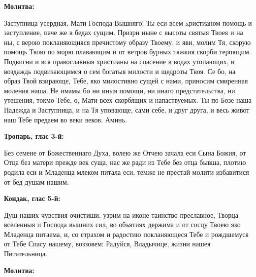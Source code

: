  


\bfseries Молитва:\normalfont{}\nopagebreak


Заступница усердная, Мати Господа Вышняго! Ты еси всем xристианом помощь и заступление, паче же в бедах сущим. Призри ныне с высоты святыя Твоея и на ны, с верою покланяющияся пречистому образу Твоему, и яви, молим Тя, скорую помощь Твою по морю плавающим и от ветров бурных тяжкия скорби терпящим. Подвигни и вся православныя христианы на спасение в водах утопающих, и воздаждь подвизающимся о сем богатыя милости и щедроты Твоя. Се бо, на образ Твой взирающе, Тебе, яко милостивно сущей с нами, приносим смиренная моления наша. Не имамы бо ни иныя помощи, ни инаго предстательства, ни утешения, токмо Тебе, о, Мати всех скорбящих и напаствуемых. Ты по Бозе наша Надежда и Заступница, и на Тя уповающе, сами себе, и друг друга, и весь живот наш Тебе предаем во веки веков. Аминь.
\nopagebreak\bigskip\bigskip\mychapterending

 

\bfseries Тропарь, глас 3-й:\normalfont{}\nopagebreak


Без семене от Божественнаго Духа, волею же Отчею зачала еси Сына Божия, от Отца без матери прежде век суща, нас же ради из Тебе без отца бывша, плотию родила еси и Младенца млеком питала еси, темже не престай молити избавитися от бед душам нашим.


\medskip


\bfseries Кондак, глас 5-й:\normalfont{}\nopagebreak


Душ наших чувствия очистиши, узрим на иконе таинство преславное, Творца вселенныя и Господа вышних сил, во объятиях держима и от сосцу Твоею яко Младенца питаема, и, со страхом и радостию покланяющеся Тебе и рождшемуся от Тебе Спасу нашему, воззовем: Радуйся, Владычице, жизни нашея Питательница.


\medskip


\bfseries Молитва:\normalfont{}\nopagebreak


